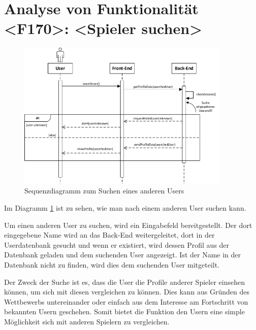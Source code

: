 \section{Analyse von Funktionalität <F170>: <Spieler suchen>}
\begin{figure}[h]
\centering
\includegraphics[width=0.9\textwidth]{figures/sequenz_F170.pdf}
\caption{Sequenzdiagramm zum Suchen eines anderen Users}
\label{sequence_f170}
\end{figure}
Im Diagramm \ref{sequence_f170} ist zu sehen, wie man nach einem anderen User suchen kann.

Um einen anderen User zu suchen, wird ein Eingabefeld bereitgestellt. Der dort eingegebene Name wird an das Back-End weitergeleitet, dort in der Userdatenbank gesucht und wenn er existiert, wird dessen Profil aus der Datenbank geladen und dem suchenden User angezeigt. Ist der Name in der Datenbank nicht zu finden, wird dies dem suchenden User mitgeteilt.

Der Zweck der Suche ist es, dass die User die Profile anderer Spieler einsehen können, um sich mit diesen vergleichen zu können. Dies kann aus Gründen des Wettbewerbs untereinander oder einfach aus dem Interesse am Fortschritt von bekannten Usern geschehen. Somit bietet die Funktion den Usern eine simple Möglichkeit sich mit anderen Spielern zu vergleichen.

\newpage
